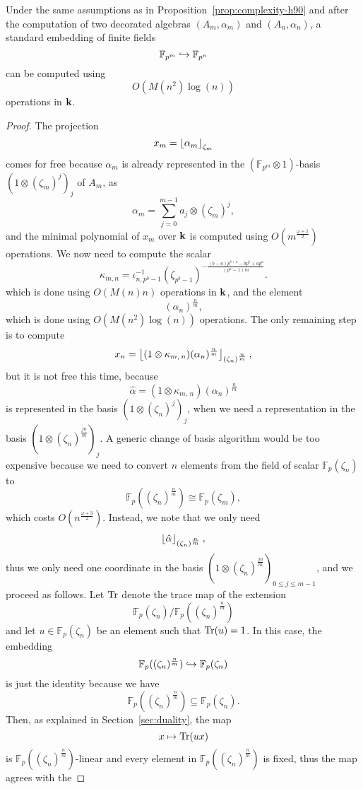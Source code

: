 \begin{prop}
Under the same assumptions as in Proposition~\ref{prop:complexity-h90} and
after the computation of two decorated algebras $(A_m,\alpha_m)$ and $(A_n,\alpha_n)$, a standard
embedding of finite fields
\[
  \mathbb{F}_{p^m}\hookrightarrow\mathbb{F}_{p^{n}}
\]
can be computed using 
\[
  O(M(n^2)\log(n))
\]
operations in $\mathbf{k}$.
\end{prop}
\begin{proof}
The projection
\[
  x_m = \left\lfloor \alpha_m \right\rfloor_{\zeta_m}
\]
comes for free because $\alpha_m$ is already represented in the
$(\mathbb{F}_{p^{m}}\otimes1)$-basis $(1\otimes(\zeta_m)^j)_j$ of $A_m$, \ie as
\[
  \alpha_m = \sum_{j=0}^{m-1}a_j\otimes(\zeta_m)^j,
\]
and the minimal polynomial of $x_m$ over $\mathbf{k}$ is computed using
$O(m^{\frac{\omega+1}{2}})$ operations. We now need to compute the scalar
\[
   \kappa_{m, n} = \iota_{n,
   p^b-1}^{-1}(\zeta_{p^b-1})^{-\frac{(b-a)p^{b+a}-bp^b+ap^a}{(p^a-1)m}}.
\]
which is done using $O(M(n)n)$ operations in $\mathbf{k}$, and the element
\[
  (\alpha_n)^{\frac{n}{m}},
\]
which is done using $O(M(n^2)\log(n))$ operations. The only remaining step is
to compute
\[
  x_n = \left\lfloor (1\otimes\kappa_{m,\,n})(\alpha_{n})^{\frac{n}{m}} \right\rfloor_{(\zeta_n)^{\frac{n}{m}}},
\]
but it is not free this time, because
\[
  \hat\alpha = (1\otimes\kappa_{m,\,n})(\alpha_{n})^{\frac{n}{m}}
\]
is represented in the basis $(1\otimes(\zeta_n)^j)_j$, when we need a representation
in the basis $(1\otimes(\zeta_n)^{\frac{jn}{m}})_j$. A generic change of basis
algorithm would be too expensive because we need to convert $n$ elements from
the field of scalar $\mathbb{F}_{p}(\zeta_n)$ to
\[
  \mathbb{F}_p( (\zeta_n)^{\frac{n}{m}}) \cong \mathbb{F}_p(\zeta_m),
\]
which costs $O(n^{\frac{\omega+3}{2}})$. Instead, we note that we only need
\[
  \left\lfloor \hat\alpha \right\rfloor_{(\zeta_n)^{\frac{n}{m}}},
\]
thus we only need one coordinate in the basis
$(1\otimes(\zeta_n)^{\frac{jn}{m}})_{0\leq j\leq m-1}$, and we proceed as follows. Let $\operatorname{Tr}$ denote
the trace map of the extension
\[
  \mathbb{F}_p(\zeta_n) / \mathbb{F}_p( (\zeta_n)^{\frac{n}{m}})
\]
and let $u\in\mathbb{F}_p(\zeta_n)$ be an element such that $\operatorname{Tr}(u)=1$.
In this case, the embedding 
\[
  \mathbb{F}_p( (\zeta_n)^{\frac{n}{m}})\hookrightarrow\mathbb{F}_p(\zeta_n) 
\]
is just the identity because we have 
\[
  \mathbb{F}_p( (\zeta_n)^{\frac{n}{m}})\subseteq\mathbb{F}_p(\zeta_n).
\]
Then, as explained in Section~\ref{sec:duality}, the map
\[
  x\mapsto\operatorname{Tr}(ux)
\]
is $\mathbb{F}_p( (\zeta_n)^{\frac{n}{m}})$-linear and every element in
$\mathbb{F}_p((\zeta_n)^{\frac{n}{m}})$ is fixed, thus the map agrees with the

\end{proof}
